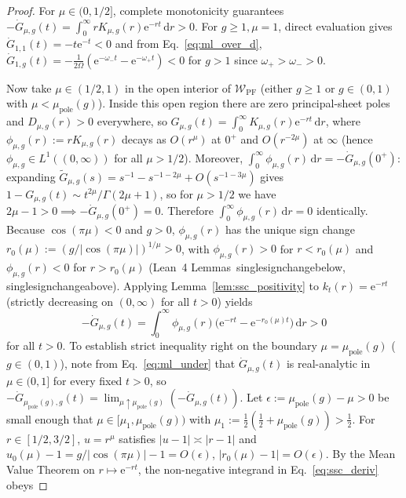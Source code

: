 \documentclass[twocolumn,10pt,amsmath,amssymb,floatfix]{revtex4-2}
\theoremstyle{plain}
\theoremstyle{definition}
\newcommand{\dd}{\mathrm{d}}
\newcommand{\ee}{\mathrm{e}}
\newcommand{\mupole}{\mu_{\mathrm{pole}}}
\newcommand{\leanid}[1]{{\footnotesize\ttfamily\def\_{\textunderscore\penalty0\hspace{0pt}}#1}}
\begin{document}
\begin{proof}
For $\mu \in (0,1/2]$, complete monotonicity guarantees $-\dot{G}_{\mu,g}(t) = \int_0^\infty r K_{\mu,g}(r)\ee^{-rt}\,\dd r > 0$. For $g \ge 1, \mu = 1$, direct evaluation gives $\dot{G}_{1,1}(t) = -t\ee^{-t} < 0$ and from Eq.~\eqref{eq:ml_over_d}, $\dot{G}_{1,g}(t) = -\frac{1}{2\Omega}(\ee^{-\omega_- t} - \ee^{-\omega_+ t}) < 0$ for $g > 1$ since $\omega_+ > \omega_- > 0$.

Now take $\mu \in (1/2, 1)$ in the open interior of $\mathcal{W}_{\mathrm{PF}}$ (either $g \ge 1$ or $g \in (0,1)$ with $\mu < \mupole(g)$). Inside this open region there are zero principal-sheet poles and $D_{\mu,g}(r) > 0$ everywhere, so $G_{\mu,g}(t) = \int_0^\infty K_{\mu,g}(r)\ee^{-rt}\,\dd r$, where $\phi_{\mu,g}(r) := r K_{\mu,g}(r)$ decays as $O(r^\mu)$ at $0^+$ and $O(r^{-2\mu})$ at $\infty$ (hence $\phi_{\mu,g} \in L^1((0,\infty))$ for all $\mu > 1/2$). Moreover, $\int_0^\infty \phi_{\mu,g}(r)\,\dd r = -\dot{G}_{\mu,g}(0^+)$: expanding $\tilde{G}_{\mu,g}(s) = s^{-1} - s^{-1-2\mu} + O(s^{-1-3\mu})$ gives $1 - G_{\mu,g}(t) \sim t^{2\mu}/\Gamma(2\mu+1)$, so for $\mu > 1/2$ we have $2\mu - 1 > 0 \implies -\dot{G}_{\mu,g}(0^+) = 0$. Therefore $\int_0^\infty \phi_{\mu,g}(r)\,\dd r = 0$ identically. Because $\cos(\pi\mu) < 0$ and $g > 0$, $\phi_{\mu,g}(r)$ has the unique sign change $r_0(\mu) := (g/|\cos(\pi\mu)|)^{1/\mu} > 0$, with $\phi_{\mu,g}(r) > 0$ for $r < r_0(\mu)$ and $\phi_{\mu,g}(r) < 0$ for $r > r_0(\mu)$ (Lean~4 Lemmas~\leanid{single\_sign\_change\_below}, \leanid{single\_sign\_change\_above}). Applying Lemma~\ref{lem:ssc_positivity} to $k_t(r) = \ee^{-rt}$ (strictly decreasing on $(0,\infty)$ for all $t > 0$) yields
\begin{equation}
\label{eq:ssc_deriv}
-\dot{G}_{\mu,g}(t) = \int_0^\infty \phi_{\mu,g}(r)\big(\ee^{-rt} - \ee^{-r_0(\mu) t}\big)\,\dd r > 0
\end{equation}
for all $t > 0$. To establish strict inequality right on the boundary $\mu = \mupole(g)$ ($g \in (0,1)$), note from Eq.~\eqref{eq:ml_under} that $\dot{G}_{\mu,g}(t)$ is real-analytic in $\mu \in (0,1]$ for every fixed $t > 0$, so $-\dot{G}_{\mupole(g),g}(t) = \lim_{\mu \uparrow \mupole(g)}(-\dot{G}_{\mu,g}(t))$. Let $\epsilon := \mupole(g) - \mu > 0$ be small enough that $\mu \in [\mu_1, \mupole(g))$ with $\mu_1 := \frac{1}{2}(\frac{1}{2} + \mupole(g)) > \frac{1}{2}$. For $r \in [1/2, 3/2]$, $u = r^\mu$ satisfies $|u - 1| \asymp |r - 1|$ and $u_0(\mu) - 1 = g/|\cos(\pi\mu)| - 1 = O(\epsilon)$, $|r_0(\mu) - 1| = O(\epsilon)$. By the Mean Value Theorem on $r \mapsto \ee^{-rt}$, the non-negative integrand in Eq.~\eqref{eq:ssc_deriv} obeys

\end{proof}
\end{document}
